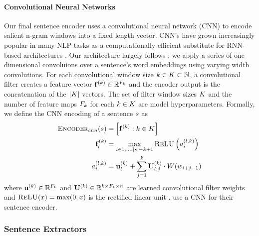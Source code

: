 \paragraph{Convolutional Neural Networks}
Our final sentence encoder uses a convolutional neural network
(CNN) to encode salient n-gram windows into a fixed length vector. 
CNN's have grown increasingly popular in many NLP tasks 
as a computationally efficient substitute for RNN-based architectures
\citep{kim2014convolutional,lei2015molding,dauphin2017language}.
Our architecture largely follows \cite{kim2014convolutional}: we apply a 
series of one dimensional convoluions over a sentence's word embeddings
using varying width convolutions. For each convolutional window size 
$k \in K \subset \mathbb{N}$, a convolutional filter creates 
a feature vector $\mathbf{f}_{}^{( k )} \in \mathbb{R}^{F_k}$ 
and the encoder output is the concatenation of the $|K|$ vectors. 
The set of filter window sizes $K$ and the number of feature maps
$F_k$ for each $k \in K$ are 
model hyperparameters.
Formally, we define the CNN encoding of a sentence $s$ as 
\begin{align}
\textsc{Encoder}_{cnn}(s) & = \left[\mathbf{f}_{}^{( k )} : k \in K \right]\\
\mathbf{f}_{l}^{( k )} &= 
     \max_{i \in 1,\dots, |s| - k + 1} 
       \textsc{ReLU}\left(a^{(l,k)}_i \right) \\
a^{(l,k)}_i &= \mathbf{u}^{(k)}_l
    + \sum^{k}_{j=1} \mathbf{U}^{(k)}_{l,j} \cdot W(w_{i + j -1})
\end{align}
where $\mathbf{u}^{(k)} \in \mathbb{R}^{F_k}$ and $\mathbf{U}^{(k)} \in \mathbb{R}^{k \times F_k \times n}$
are learned convolutional filter weights and $\textsc{ReLU}(x) = \max(0, x)$ 
is the rectified linear unit \citep{nair2010rectified}. \cite{cheng2016neural}
use a CNN for their sentence encoder.

\subsubsection{Sentence Extractors}

